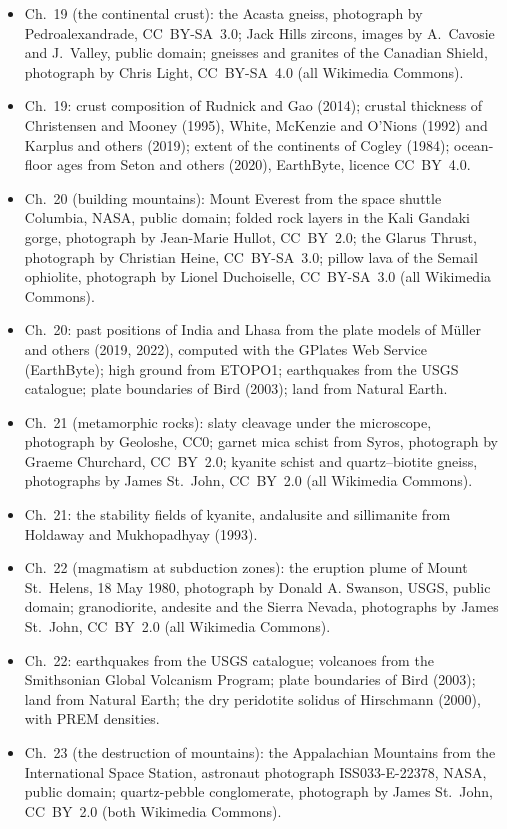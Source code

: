 \begin{itemize}
  \item Ch.~19 (the continental crust): the Acasta gneiss, photograph by Pedroalexandrade, CC~BY-SA~3.0; Jack Hills zircons, images by A.~Cavosie and J.~Valley, public domain; gneisses and granites of the Canadian Shield, photograph by Chris Light, CC~BY-SA~4.0 (all Wikimedia Commons).
  \item Ch.~19: crust composition of Rudnick and Gao (2014); crustal thickness of Christensen and Mooney (1995), White, McKenzie and O'Nions (1992) and Karplus and others (2019); extent of the continents of Cogley (1984); ocean-floor ages from Seton and others (2020), EarthByte, licence CC~BY~4.0.
  \item Ch.~20 (building mountains): Mount Everest from the space shuttle Columbia, NASA, public domain; folded rock layers in the Kali Gandaki gorge, photograph by Jean-Marie Hullot, CC~BY~2.0; the Glarus Thrust, photograph by Christian Heine, CC~BY-SA~3.0; pillow lava of the Semail ophiolite, photograph by Lionel Duchoiselle, CC~BY-SA~3.0 (all Wikimedia Commons).
  \item Ch.~20: past positions of India and Lhasa from the plate models of Müller and others (2019, 2022), computed with the GPlates Web Service (EarthByte); high ground from ETOPO1; earthquakes from the USGS catalogue; plate boundaries of Bird (2003); land from Natural Earth.
  \item Ch.~21 (metamorphic rocks): slaty cleavage under the microscope, photograph by Geoloshe, CC0; garnet mica schist from Syros, photograph by Graeme Churchard, CC~BY~2.0; kyanite schist and quartz--biotite gneiss, photographs by James St.~John, CC~BY~2.0 (all Wikimedia Commons).
  \item Ch.~21: the stability fields of kyanite, andalusite and sillimanite from Holdaway and Mukhopadhyay (1993).
  \item Ch.~22 (magmatism at subduction zones): the eruption plume of Mount St.~Helens, 18 May 1980, photograph by Donald A. Swanson, USGS, public domain; granodiorite, andesite and the Sierra Nevada, photographs by James St.~John, CC~BY~2.0 (all Wikimedia Commons).
  \item Ch.~22: earthquakes from the USGS catalogue; volcanoes from the Smithsonian Global Volcanism Program; plate boundaries of Bird (2003); land from Natural Earth; the dry peridotite solidus of Hirschmann (2000), with PREM densities.
  \item Ch.~23 (the destruction of mountains): the Appalachian Mountains from the International Space Station, astronaut photograph ISS033-E-22378, NASA, public domain; quartz-pebble conglomerate, photograph by James St.~John, CC~BY~2.0 (both Wikimedia Commons).

\end{itemize}
